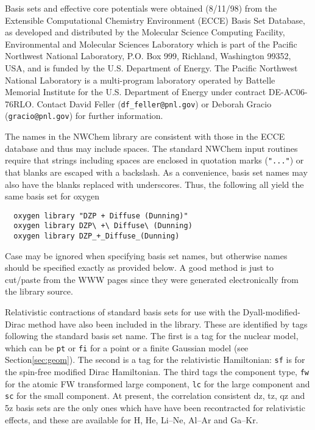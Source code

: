 \label{sec:knownbasis}

Basis sets and effective core potentials were obtained (8/11/98) from
the Extensible Computational Chemistry Environment (ECCE) Basis Set
Database, as developed and distributed by the Molecular Science
Computing Facility, Environmental and Molecular Sciences Laboratory
which is part of the Pacific Northwest National Laboratory, P.O. Box
999, Richland, Washington 99352, USA, and is funded by the
U.S. Department of Energy.  The Pacific Northwest National Laboratory
is a multi-program laboratory operated by Battelle Memorial Institute
for the U.S. Department of Energy under contract DE-AC06-76RLO.
Contact David Feller (\verb+df_feller@pnl.gov+) or Deborah Gracio
(\verb+gracio@pnl.gov+) for further information.

The names in the NWChem library are consistent with those in the ECCE
database and thus may include spaces.  The standard NWChem input
routines require that strings including spaces are enclosed in
quotation marks (\verb+"..."+) or that blanks are escaped with a
backslash.  As a convenience, basis set names may also have the blanks
replaced with underscores.  Thus, the following all yield the same
basis set for oxygen
\begin{verbatim}
  oxygen library "DZP + Diffuse (Dunning)"
  oxygen library DZP\ +\ Diffuse\ (Dunning)
  oxygen library DZP_+_Diffuse_(Dunning)
\end{verbatim}

Case may be ignored when specifying basis set names, but otherwise
names should be specified exactly as provided below.  A good method is
just to cut/paste from the WWW pages since they were generated
electronically from the library source.

Relativistic contractions of standard basis sets for use with the
Dyall-modified-Dirac method have also been included in the library. These
are identified by tags following the standard basis set name.  The first is
a tag for the nuclear model, which can be \verb+pt+ or \verb+fi+ for a point
or a finite Gaussian model (see Section\ref{sec:geom}).  The second is a tag
for the relativistic Hamiltonian: \verb+sf+ is for the spin-free modified
Dirac Hamiltonian. The third tags the component type, \verb+fw+ for the
atomic FW transformed large component, \verb+lc+ for the large component and
\verb+sc+ for the small component. At present, the correlation consistent
dz, tz, qz and 5z basis sets are the only ones which have have been
recontracted for relativistic effects, and these are available for H, He,
Li--Ne, Al--Ar and Ga--Kr.

